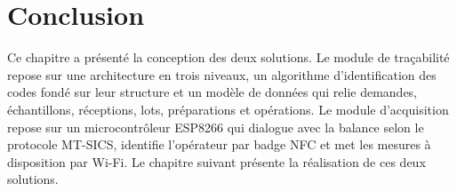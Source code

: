\section*{Conclusion}

Ce chapitre a présenté la conception des deux solutions. Le module de traçabilité repose sur une architecture en trois niveaux, un algorithme d'identification des codes fondé sur leur structure et un modèle de données qui relie demandes, échantillons, réceptions, lots, préparations et opérations. Le module d'acquisition repose sur un microcontrôleur ESP8266 qui dialogue avec la balance selon le protocole \ac{MT-SICS}, identifie l'opérateur par badge \ac{NFC} et met les mesures à disposition par \ac{Wi-Fi}. Le chapitre suivant présente la réalisation de ces deux solutions.
